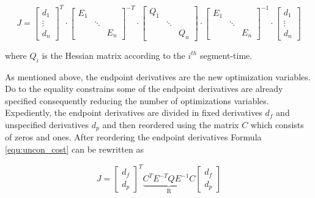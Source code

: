 \begin{equation}
J =
\begin{bmatrix}
   d_1 \\
\vdots \\
  d_n
\end{bmatrix}^T
\cdot
\begin{bmatrix}
   E_1 &  &  \\
    & \ddots &  \\
   & & E_n
\end{bmatrix} ^{-T}
\cdot
\begin{bmatrix}
   Q_1 &  &  \\
    & \ddots &  \\
   & & Q_n
\end{bmatrix} 
\cdot
\begin{bmatrix}
   E_1 &  &  \\
    & \ddots &  \\
   & & E_n
\end{bmatrix} ^{-1}
\cdot
\begin{bmatrix}
   d_1 \\
\vdots \\
  d_n
\end{bmatrix}
\label{equ:uncon_cost}
\end{equation}

where $Q_i$ is the Hessian matrix according to the $i^{th}$ segment-time.\newline

As mentioned above, the endpoint derivatives are the new optimization variables. Do to the equality constrains some of the endpoint derivatives are already specified consequently reducing the number of optimizations variables. Expediently, the endpoint derivatives are divided in fixed derivatives $d_f$ and unspecified derivatives $d_p$ and then reordered using the matrix $C$ which consists of zeros and ones. After reordering the endpoint derivatives Formula \ref{equ:uncon_cost} can be rewritten as

\begin{equation}
J =
\begin{bmatrix}
   d_f \\
  d_p
\end{bmatrix}^T
\underbrace{C^T E^{-T} Q E^{-1} C}_\text{R}
\begin{bmatrix}
   d_f \\
  d_p
\end{bmatrix}
\label{equ:R_cost}
\end{equation}

